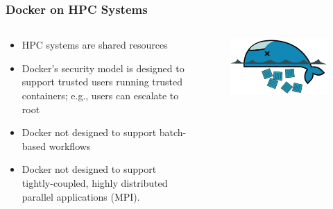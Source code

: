 \documentclass{beamer}
\begin{document}
\begin{frame}
   \frametitle{Docker on HPC Systems}
   \begin{columns}
      \begin{column}{0.6\textwidth}
      \begin{itemize}
         \setlength\itemsep{1.0em}
         \item HPC systems are shared resources
         \item Docker's security model is designed to support trusted 
            users running trusted containers; e.g., users can escalate to
            root
         \item Docker not designed to support batch-based workflows
         \item Docker not designed to support tightly-coupled, highly
            distributed parallel applications (MPI).
         \end{itemize}
      \end{column}
      \hfill
      \begin{column}{0.5\textwidth}
         \begin{figure}[htbp]
            \includegraphics[width=1.0\textwidth]{images/docker-dead-logo.jpg}
         \end{figure}
      \end{column}
   \end{columns}
\end{frame}
\end{document}
